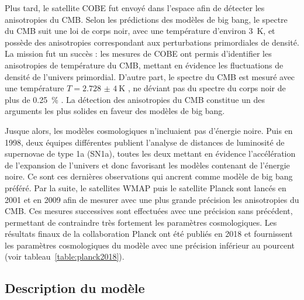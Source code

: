 \documentclass[11pt, twoside, a4paper, openright]{report}
\begin{document}
Plus tard, le satellite COBE fut envoyé dans l'espace afin de détecter les anisotropies du CMB. Selon les prédictions des modèles de big bang, le spectre du CMB suit une loi de corps noir, avec une température d'environ \SI{3}{\kelvin}, et possède des anisotropies correspondant aux perturbations primordiales de densité. La mission fut un succès : les mesures de COBE ont permis d'identifier les anisotropies de température du CMB, mettant en évidence les fluctuations de densité de l'univers primordial. D'autre part, le spectre du CMB est mesuré avec une température $T = \SI{2,728(4)}{\kelvin}$ \autocite{Fixsen1996}, ne déviant pas du spectre du corps noir de plus de \SI{0,25}{\percent} \autocite{Bennett1993}. La détection des anisotropies du CMB constitue un des arguments les plus solides en faveur des modèles de big bang.

Jusque alors, les modèles cosmologiques n'incluaient pas d'énergie noire. Puis en 1998, deux équipes différentes publient l'analyse de distances de luminosité de supernovae de type 1a (SN1a), toutes les deux mettant en évidence l'accélération de l'expansion de l'univers et donc favorisant les modèles contenant de l'énergie noire. Ce sont ces dernières observations qui ancrent \lcdm{} comme modèle de big bang préféré. Par la suite, le satellites WMAP puis le satellite Planck sont lancés en 2001 et en 2009 afin de mesurer avec une plus grande précision les anisotropies du CMB. Ces mesures successives sont effectuées avec une précision sans précédent, permettant de contraindre très fortement les paramètres cosmologiques. Les résultats finaux de la collaboration Planck ont été publiés en 2018 \autocite{Collaboration2018} et fournissent les paramètres cosmologiques du modèle \lcdm{} avec une précision inférieur au pourcent (voir tableau~\ref{table:planck2018}).

\subsection{Description du modèle}
\label{subsec:descri_mod}
\end{document}
